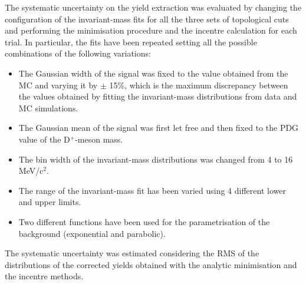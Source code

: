 \documentclass[b5paper,10pt,twoside,oldstyle,classica]{toptesi}
\begin{document}
\label{cutvar_syst_massfits_sec}
The systematic uncertainty on the yield extraction was evaluated by changing the configuration of the invariant-mass fits for all the three sets of topological cuts and performing the minimisation procedure and the incentre calculation for each trial. In particular, the fits have been repeated setting all the possible combinations of the following variations:
\begin{itemize}
 \item The Gaussian width of the signal was fixed to the value obtained from the MC and varying it by $\pm$ 15\%, which is the maximum discrepancy between the values obtained by fitting the invariant-mass distributions from data and MC simulations.  
 \item The Gaussian mean of the signal was first let free and then fixed to the PDG value of the D$^+$-meson mass.
 \item The bin width of the invariant-mass distributions was changed from 4 to 16 MeV/c$^2$.
 \item The range of the invariant-mass fit has been varied using 4 different lower and upper limits.
 \item Two different functions have been used for the parametrisation of the background (exponential and parabolic).
\end{itemize}
The systematic uncertainty was estimated considering the RMS of the distributions of the corrected yields obtained with the analytic minimisation and the incentre methods. 
\end{document}
